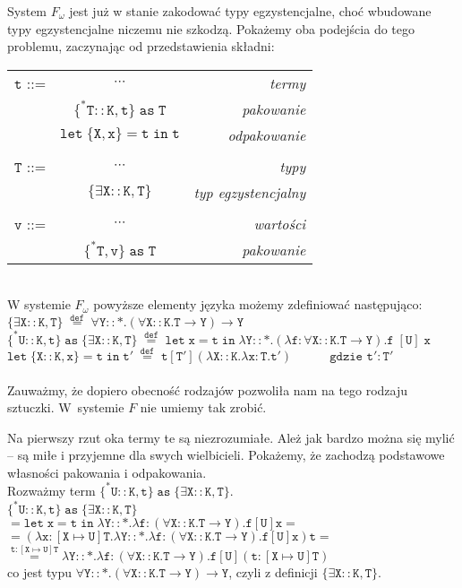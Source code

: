 \documentclass[11pt,leqno]{article}
\begin{document}
System $F_\omega$ jest już w stanie zakodować typy egzystencjalne, choć wbudowane typy egzystencjalne niczemu nie szkodzą. Pokażemy oba podejścia do tego problemu, zaczynając od przedstawienia składni: \\

\begin{tabular}{| l c r |}
  \hline
  $\mathtt{t}$ ::= & $\cdots$ & \textit{termy}  \\
   & $\mathtt{\{^*T::K,t\}\;as\;T}$ & \textit{pakowanie} \\
   & $\mathtt{let\;\{X,x\}=t\;in\;t}$ & \textit{odpakowanie} \\
   & & \\
  $\mathtt{T}$ ::= & $\cdots$ & \textit{typy}  \\
   & $\mathtt{\{\exists X::K,T\}}$ & \textit{typ egzystencjalny} \\
   & & \\
  $\mathtt{v}$ ::= & $\cdots$ & \textit{wartości}  \\
   & $\mathtt{\{^*T,v\}\;as\;T}$ & \textit{pakowanie} \\
  \hline
\end{tabular} \\

W systemie $F_\omega$ powyższe elementy języka możemy zdefiniować następująco: \\
$\mathtt{\{\exists X::K,T\}\;\overset{def}{=}\;\forall Y::\ast.(\forall X::K.T \rightarrow Y) \rightarrow Y}$ \\
$\mathtt{\{^*U::K,t\}\;as\; \{\exists X::K,T\}\; \overset{def}{=} \;let\;x=t\;in\;\lambda Y::\ast.(\lambda f:\forall X::K.T \rightarrow Y) .f\;[U]\;x}$ \\
$\mathtt{let\;\{X::K,x\}=t\;in\;t'\;\overset{def}{=}\;t[T'](\lambda X::K.\lambda x:T.t')\hspace{3em} \text{gdzie $\mathtt{t':T'}$} }$ \\ \\

Zauważmy, że dopiero obecność rodzajów pozwoliła nam na tego rodzaju sztuczki. W~systemie $F$ nie umiemy tak zrobić.

Na pierwszy rzut oka termy te są niezrozumiałe. Ależ jak bardzo można się mylić -- są miłe i przyjemne dla swych wielbicieli. Pokażemy, że zachodzą podstawowe własności pakowania i odpakowania. \\
Rozważmy term $\mathtt{ \{^*U::K,t\}\;as\; \{\exists X::K,T\}}$. \\ 
$ \mathtt{ \{^*U::K,t\}\;as\; \{\exists X::K,T\} }$ \\ 
$ \mathtt{ = let\;x=t\;in\;\lambda Y::\ast.\lambda f:(\forall X::K.T \rightarrow Y).f[U]x = }$ \\
$ \mathtt{ = (\lambda x:[X \mapsto U]T.\lambda Y::\ast.\lambda f:(\forall X::K.T \rightarrow Y).f[U]x)t = }$ \\
$ \mathtt{ \overset{t:[X \mapsto U]T}{=} \lambda Y::\ast.\lambda f:(\forall X::K.T \rightarrow Y).f[U](t:[X \mapsto U]T)}$ \\
co jest typu $\mathtt{\forall Y::\ast.(\forall X::K.T \rightarrow Y) \rightarrow Y}$, czyli z definicji $\mathtt{\{\exists X::K,T\}}$. \\
\end{document}
